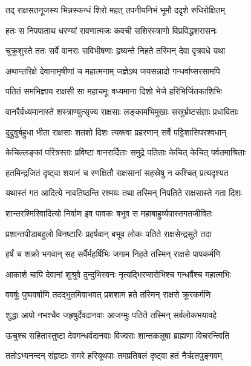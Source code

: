 \twolineshloka
{तद् राक्षसतनूजस्य भिन्नस्कन्धं शिरो महत्}
{तपनीयनिभं भूमौ ददृशे रुधिरोक्षितम्} %

\twolineshloka
{हतः स निपपाताथ धरण्यां रावणात्मजः}
{कवची सशिरस्त्राणो विप्रविद्धशरासनः} %

\twolineshloka
{चुक्रुशुस्ते ततः सर्वे वानराः सविभीषणाः}
{हृष्यन्ते निहते तस्मिन् देवा वृत्रवधे यथा} %

\twolineshloka
{अथान्तरिक्षे देवानामृषीणां च महात्मनाम्}
{जज्ञेऽथ जयसन्नादो गन्धर्वाप्सरसामपि} %

\twolineshloka
{पतितं समभिज्ञाय राक्षसी सा महाचमूः}
{वध्यमाना दिशो भेजे हरिभिर्जितकाशिभिः} %

\twolineshloka
{वानरैर्वध्यमानास्ते शस्त्राण्युत्सृज्य राक्षसाः}
{लङ्कामभिमुखाः सस्रुर्भ्रष्टसंज्ञाः प्रधाविताः} %

\twolineshloka
{दुद्रुवुर्बहुधा भीता राक्षसाः शतशो दिशः}
{त्यक्त्वा प्रहरणान् सर्वे पट्टिशासिपरश्वधान्} %

\twolineshloka
{केचिल्लङ्कां परित्रस्ताः प्रविष्टा वानरार्दिताः}
{समुद्रे पतिताः केचित् केचित् पर्वतमाश्रिताः} %

\twolineshloka
{हतमिन्द्रजितं दृष्ट्वा शयानं च रणक्षितौ}
{राक्षसानां सहस्रेषु न कश्चित् प्रत्यदृश्यत} %

\twolineshloka
{यथास्तं गत आदित्ये नावतिष्ठन्ति रश्मयः}
{तथा तस्मिन् निपतिते राक्षसास्ते गता दिशः} %

\twolineshloka
{शान्तरश्मिरिवादित्यो निर्वाण इव पावकः}
{बभूव स महाबाहुर्व्यपास्तगतजीवितः} %

\twolineshloka
{प्रशान्तपीडाबहुलो विनष्टारिः प्रहर्षवान्}
{बभूव लोकः पतिते राक्षसेन्द्रसुते तदा} %

\twolineshloka
{हर्षं च शक्रो भगवान् सह सर्वैर्महर्षिभिः}
{जगाम निहते तस्मिन् राक्षसे पापकर्मणि} %

\twolineshloka
{आकाशे चापि देवानां शुश्रुवे दुन्दुभिस्वनः}
{नृत्यद्भिरप्सरोभिश्च गन्धर्वैश्च महात्मभिः} %

\twolineshloka
{ववर्षुः पुष्पवर्षाणि तदद्भुतमिवाभवत्}
{प्रशशाम हते तस्मिन् राक्षसे क्रूरकर्मणि} %

\twolineshloka
{शुद्धा आपो नभश्चैव जहृषुर्देवदानवाः}
{आजग्मुः पतिते तस्मिन् सर्वलोकभयावहे} %

\twolineshloka
{ऊचुश्च सहितास्तुष्टा देवगन्धर्वदानवाः}
{विज्वराः शान्तकलुषा ब्राह्मणा विचरन्त्विति} %

\twolineshloka
{ततोऽभ्यनन्दन् संहृष्टाः समरे हरियूथपाः}
{तमप्रतिबलं दृष्ट्वा हतं नैर्ऋतपुङ्गवम्} %

